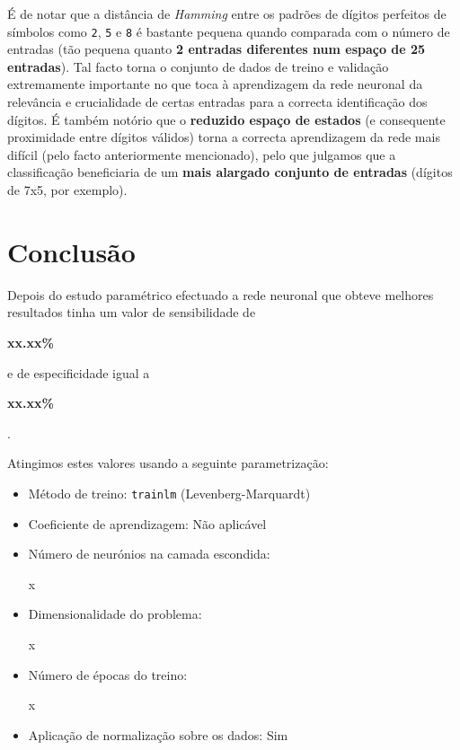 \documentclass{article}
\newenvironment{text-red}{\color{red}}{}
\begin{document}
É de notar que a distância de \textit{Hamming} entre os padrões de dígitos perfeitos de símbolos como \texttt{2}, \texttt{5} e \texttt{8} é bastante pequena quando comparada com o número de entradas (tão pequena quanto \textbf{2 entradas diferentes num espaço de 25 entradas}). Tal facto torna o conjunto de dados de treino e validação extremamente importante no que toca à aprendizagem da rede neuronal da relevância e crucialidade de certas entradas para a correcta identificação dos dígitos. É também notório que o \textbf{reduzido espaço de estados} (e consequente proximidade entre dígitos válidos) torna a correcta aprendizagem da rede mais difícil (pelo facto anteriormente mencionado), pelo que julgamos que a classificação beneficiaria de um \textbf{mais alargado conjunto de entradas} (dígitos de 7x5, por exemplo).

\clearpage
\section{Conclusão}
\indent \indent Depois do estudo paramétrico efectuado a rede neuronal que obteve melhores resultados tinha um valor de sensibilidade de \begin{text-red}\textbf{xx.xx\%}\end{text-red} e de especificidade igual a \begin{text-red}\textbf{xx.xx\%}\end{text-red}.

Atingimos estes valores usando a seguinte parametrização:
\begin{itemize}
\item Método de treino: \texttt{trainlm} (Levenberg-Marquardt)
\item Coeficiente de aprendizagem: Não aplicável
\item Número de neurónios na camada escondida: \begin{text-red}x\end{text-red}
\item Dimensionalidade do problema: \begin{text-red}x\end{text-red}
\item Número de épocas do treino: \begin{text-red}x\end{text-red}
\item Aplicação de normalização sobre os dados: Sim
\end{itemize}
\end{document}
